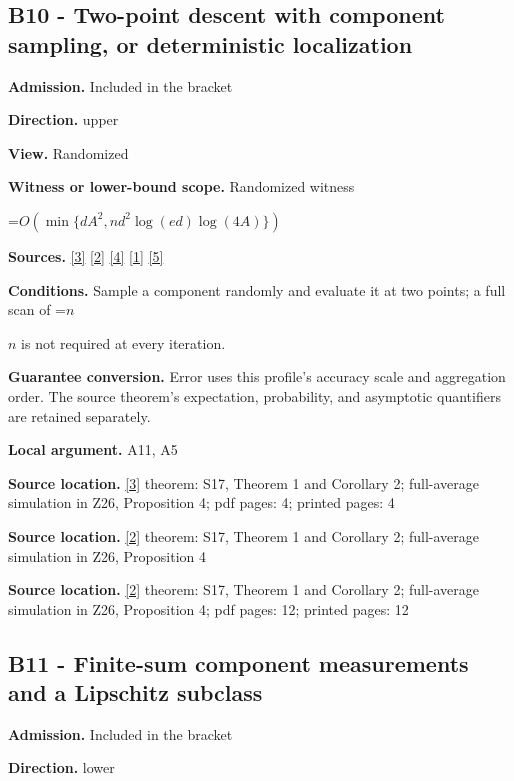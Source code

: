 \documentclass[10pt,a4paper]{article}
\newcommand{\AtlasMath}[1]{\par\begingroup\centering\setbox0=\hbox{$\displaystyle #1$}\ifdim\wd0>1.4\linewidth\typeout{ATLAS WIDE FORMULA: \the\wd0}\fi\ifdim\wd0>\linewidth\resizebox{\linewidth}{!}{\box0}\else\box0\fi\par\endgroup}
\newcommand{\AtlasInlineMath}[1]{\begingroup\setbox0=\hbox{$#1$}\ifdim\wd0>.4\linewidth\endgroup\AtlasMath{#1}\else\endgroup$#1$\fi}
\begin{document}
\subsection{B10 - Two-point descent with component sampling, or deterministic localization}
\textbf{Admission.} Included in the bracket

\textbf{Direction.} upper

\textbf{View.} Randomized

\textbf{Witness or lower-bound scope.} Randomized witness

\AtlasMath{O\!\left(\min\{dA^2,nd^2\log(ed)\log(4A)\}\right)}
\textbf{Sources.} \href{https://jmlr.org/papers/volume18/16-632/16-632.pdf}{[3]} \href{https://arxiv.org/html/2607.16558v2}{[2]} \href{https://www.mathnet.ru/php/archive.phtml?jrnid=mzm&option_lang=eng&paperid=1697&wshow=paper}{[4]} \href{https://arxiv.org/html/2610.00345v1}{[1]} \href{https://arxiv.org/abs/2109.08858}{[5]}

\textbf{Conditions.} Sample a component randomly and evaluate it at two points; a full scan of \AtlasInlineMath{n} is not required at every iteration.

\textbf{Guarantee conversion.} Error uses this profile's accuracy scale and aggregation order. The source theorem's expectation, probability, and asymptotic quantifiers are retained separately.

\textbf{Local argument.} A11, A5

\textbf{Source location.} \href{https://jmlr.org/papers/volume18/16-632/16-632.pdf}{[3]} theorem: S17, Theorem 1 and Corollary 2; full-average simulation in Z26, Proposition 4; pdf pages: 4; printed pages: 4

\textbf{Source location.} \href{https://arxiv.org/html/2607.16558v2}{[2]} theorem: S17, Theorem 1 and Corollary 2; full-average simulation in Z26, Proposition 4

\textbf{Source location.} \href{https://arxiv.org/html/2607.16558v2}{[2]} theorem: S17, Theorem 1 and Corollary 2; full-average simulation in Z26, Proposition 4; pdf pages: 12; printed pages: 12

\subsection{B11 - Finite-sum component measurements and a Lipschitz subclass}
\textbf{Admission.} Included in the bracket

\textbf{Direction.} lower
\end{document}

